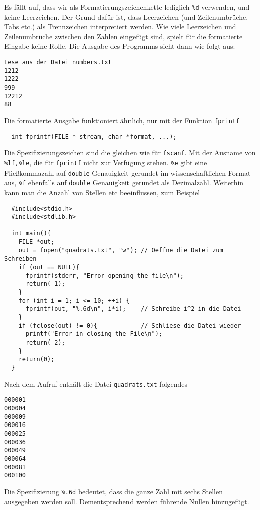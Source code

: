 Es fällt auf, dass wir als Formatierungszeichenkette lediglich \verb|%d| verwenden, und keine Leerzeichen.
Der Grund dafür ist, dass Leerzeichen (und Zeilenumbrüche, Tabs etc.) als Trennzeichen interpretiert werden.
Wie viele Leerzeichen und Zeilenumbrüche zwischen den Zahlen eingefügt sind, spielt für die formatierte Eingabe keine Rolle.
Die Ausgabe des Programms sieht dann wie folgt aus:
\begin{verbatim}
Lese aus der Datei numbers.txt
1212
1222
999
12212
88
\end{verbatim}
Die formatierte Ausgabe funktioniert ähnlich, nur mit der Funktion \verb|fprintf|
\begin{lstlisting}
  int fprintf(FILE * stream, char *format, ...);
\end{lstlisting}
Die Spezifizierungszeichen sind die gleichen wie für \verb|fscanf|.
Mit der Ausname von \verb|%lf,%le|, die für \verb|fprintf| nicht zur Verfügung stehen.
\verb|%e| gibt eine Fließkommazahl auf \verb|double| Genauigkeit gerundet im wissenschaftlichen Format aus, \verb|%f| ebenfalls auf \verb|double| Genauigkeit gerundet als Dezimalzahl.
Weiterhin kann man die Anzahl von Stellen etc beeinflussen, zum Beispiel
\begin{lstlisting}
  #include<stdio.h>
  #include<stdlib.h>

  int main(){
    FILE *out;
    out = fopen("quadrats.txt", "w"); // Oeffne die Datei zum Schreiben
    if (out == NULL){
      fprintf(stderr, "Error opening the file\n");
      return(-1);
    }
    for (int i = 1; i <= 10; ++i) {
      fprintf(out, "%.6d\n", i*i);    // Schreibe i^2 in die Datei
    }
    if (fclose(out) != 0){            // Schliese die Datei wieder
      printf("Error in closing the File\n");
      return(-2);
    }
    return(0);
  }
\end{lstlisting}
Nach dem Aufruf enthält die Datei \verb|quadrats.txt| folgendes
\begin{verbatim}
000001
000004
000009
000016
000025
000036
000049
000064
000081
000100
\end{verbatim}
Die Spezifizierung \verb|%.6d| bedeutet, dass die ganze Zahl mit sechs Stellen ausgegeben werden soll.
Dementsprechend werden führende Nullen hinzugefügt.

